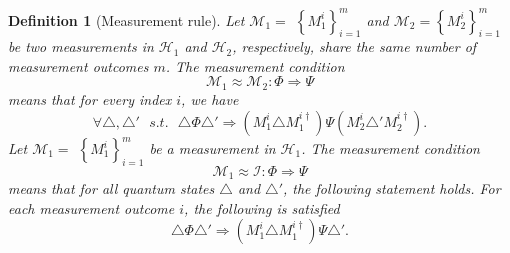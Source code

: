 \documentclass{report}
\newtheorem{definition}{Definition}[section]
\theoremstyle{defn_style}
\begin{document}
\begin{definition}[Measurement rule]
Let $\mathcal{M}_1=$ $\left\{M_1^{i}\right\}_{i=1}^m$ and $\mathcal{M}_2=\left\{M_2^i\right\}_{i=1}^m$ be two  measurements in $\mathcal{H}_1$ and $\mathcal{H}_2$,  respectively, share the same number of measurement outcomes $m$. The measurement condition
$$
\mathcal{M}_1 \approx\mathcal{M}_2: \Phi \Longrightarrow \Psi
$$
means that for every index $i$, we have
$$
\forall \triangle, \triangle' ~~~s.t.~~~ \triangle \Phi \triangle' \Longrightarrow
(M_1^i \triangle M_1^{i \dagger}) \Psi (M_2^i \triangle' M_2^{i \dagger}).
$$
Let $\mathcal{M}_1=$ $\left\{M_1^i\right\}_{i=1}^m$  be a measurement in $\mathcal{H}_1$. The measurement condition
$$
\mathcal{M}_1 \approx\mathcal{I}: \Phi \Longrightarrow\Psi
$$
means that for all quantum states $\triangle$ and $\triangle'$, the following statement holds. For each measurement outcome $i$, the following is satisfied  
$$
\triangle \Phi \triangle' \Longrightarrow
(M_1^i \triangle M_1^{i \dagger}) \Psi \triangle'.
$$
\end{definition}
\end{document}
